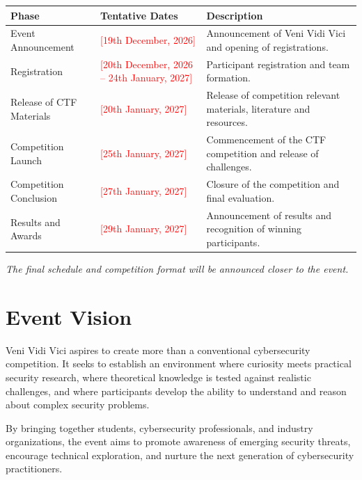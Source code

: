\documentclass[11pt,a4paper]{article}
\newcommand{\placeholder}[1]{\textcolor{red}{[#1]}}
\begin{document}
\begin{center}
\small
\begin{tabularx}{\textwidth}{>{\RaggedRight\arraybackslash}p{}
                              >{\Centering\arraybackslash}p{}
                              >{\RaggedRight\arraybackslash}X}
\toprule
\textbf{Phase} & \textbf{Tentative Dates} & \textbf{Description}\\
\midrule
Event Announcement & \placeholder{19th December, 2026} &
Announcement of Veni Vidi Vici and opening of registrations.\\

Registration & \placeholder{20th December, 2026 -- 24th January, 2027} &
Participant registration and team formation.\\


Release of CTF Materials & \placeholder{20th January, 2027} &
Release of competition relevant materials, literature and resources.\\

Competition Launch & \placeholder{25th January, 2027} &
Commencement of the CTF competition and release of challenges.\\

Competition Conclusion & \placeholder{27th January, 2027} &
Closure of the competition and final evaluation.\\

Results and Awards & \placeholder{29th January, 2027} &
Announcement of results and recognition of winning participants.\\
\bottomrule
\end{tabularx}
\end{center}

\textit{The final schedule and competition format will be announced closer to the event.}

\section{Event Vision}

Veni Vidi Vici aspires to create more than a conventional cybersecurity competition.
It seeks to establish an environment where curiosity meets practical security research,
where theoretical knowledge is tested against realistic challenges, and where
participants develop the ability to understand and reason about complex security
problems.

By bringing together students, cybersecurity professionals, and industry organizations,
the event aims to promote awareness of emerging security threats, encourage technical
exploration, and nurture the next generation of cybersecurity practitioners.
\end{document}

